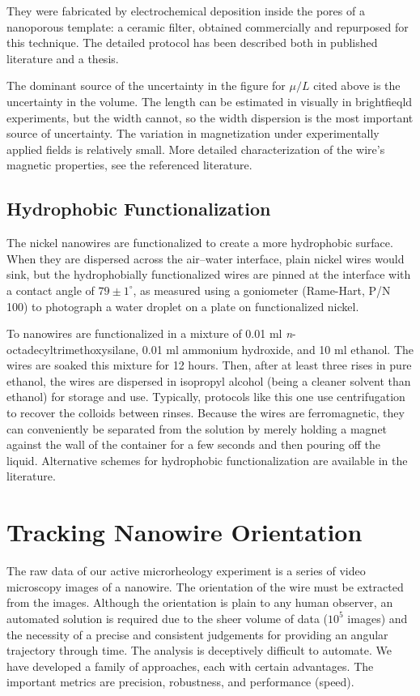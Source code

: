 They were fabricated by electrochemical deposition inside the pores of a nanoporous template: a ceramic filter, obtained commercially and repurposed for this technique. The detailed protocol has been described both in published literature\cite{Chien2002} and a thesis\cite{TanaseThesis}.

The dominant source of the uncertainty in the figure for $\mu/L$ cited above is the uncertainty in the volume. The length can be estimated in visually in brightfieqld experiments, but the width cannot, so the width dispersion is the most important source of uncertainty. The variation in magnetization under experimentally applied fields is relatively small\cite{Hultgren2004,Hultgren2005}. More detailed characterization of the wire's magnetic properties, see the referenced literature.

\subsection{Hydrophobic Functionalization}

The nickel nanowires are functionalized to create a more hydrophobic surface. When they are dispersed across the air--water interface, plain nickel wires would sink, but the hydrophobially functionalized wires are pinned at the interface with a contact angle of $79 \pm 1^\circ$, as measured using a goniometer (Rame-Hart, P/N 100)\cite{Lee2010} to photograph a water droplet on a plate on functionalized nickel.

To nanowires are functionalized in a mixture of 0.01 ml \emph{n}-octadecyltrimethoxysilane, 0.01 ml ammonium hydroxide, and 10 ml ethanol. The wires are soaked this mixture for 12 hours. Then, after at least three rises in pure ethanol, the wires are dispersed in isopropyl alcohol (being a cleaner solvent than ethanol) for storage and use. Typically, protocols like this one use centrifugation to recover the colloids between rinses. Because the wires are ferromagnetic, they can conveniently be separated from the solution by merely holding a magnet against the wall of the container for a few seconds and then pouring off the liquid. Alternative schemes for hydrophobic functionalization are available in the literature\cite{Sugimura2002,Fond2007}.

\section{Tracking Nanowire Orientation}

The raw data of our active microrheology experiment is a series of video microscopy images of a nanowire. The orientation of the wire must be extracted from the images. Although the orientation is plain to any human observer, an automated solution is required due to the sheer volume of data ($10^5$ images) and the necessity of a precise and consistent judgements for providing an angular trajectory through time. The analysis is deceptively difficult to automate. We have developed a family of approaches, each with certain advantages. The important metrics are precision, robustness, and performance (speed).

